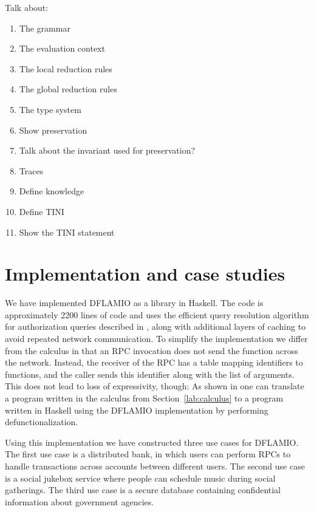 \documentclass[conference]{IEEEtran}
\begin{document}
Talk about:
\begin{enumerate}
    \item The grammar
    \item The evaluation context
    \item The local reduction rules
    \item The global reduction rules
    \item The type system
    \item Show preservation
    \item Talk about the invariant used for preservation?
    \item Traces
    \item Define knowledge
    \item Define TINI
    \item Show the TINI statement
\end{enumerate}

\section{Implementation and case studies}
We have implemented DFLAMIO as a library in Haskell. The code is approximately 2200 lines of code and uses the efficient query resolution algorithm for authorization queries described in \cite{Arden:2015:FA:2859845.2859998}, along with additional layers of caching to avoid repeated network communication. To simplify the implementation we differ from the calculus in that an RPC invocation does not send the function across the network. Instead, the receiver of the RPC has a table mapping identifiers to functions, and the caller sends this identifier along with the list of arguments. This does not lead to loss of expressivity, though: As shown in \cite{Cooper:2009:RC:1599410.1599439} one can translate a program written in the calculus from Section~\ref{lab:calculus} to a program written in Haskell using the DFLAMIO implementation by performing defunctionalization.

Using this implementation we have constructed three use cases for DFLAMIO. The first use case is a distributed bank, in which users can perform RPCs to handle transactions across accounts between different users. The second use case is a social jukebox service \cite{Lots of citations} where people can schedule music during social gatherings. The third use case is a secure database containing confidential information about government agencies.
\end{document}
